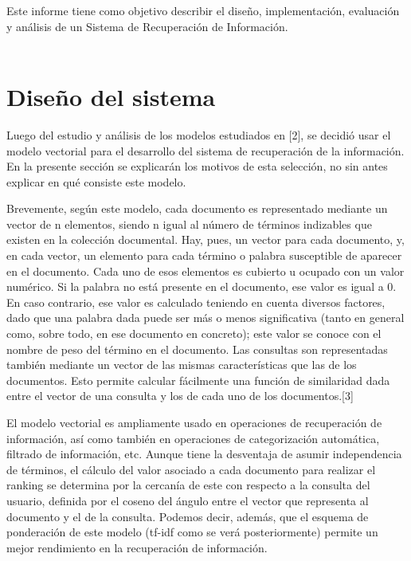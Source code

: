 \documentclass[twoside]{article}
\begin{document}
Este informe tiene como objetivo describir el dise\~no, implementaci\'on, evaluaci\'on y an\'alisis de un Sistema de Recuperaci\'on de Informaci\'on.\\\\


\section{Dise\~no del sistema}
\qquad Luego del estudio y an\'alisis de los modelos estudiados en [2], se decidi\'o usar el modelo vectorial para el desarrollo del sistema de recuperaci\'on de la informaci\'on. En la presente secci\'on se explicar\'an los motivos de esta selecci\'on, no sin antes explicar en qu\'e consiste este modelo.

Brevemente, seg\'un este modelo, cada documento es representado mediante un vector de n elementos, siendo n igual al n\'umero de t\'erminos indizables que existen en la colecci\'on documental. Hay, pues, un vector para cada documento, y, en cada vector, un elemento para cada t\'ermino o palabra susceptible de aparecer en el documento. Cada uno de esos elementos es cubierto u ocupado con un valor num\'erico. Si la palabra no est\'a presente en el documento, ese valor es igual a 0. En caso contrario, ese valor es calculado teniendo en cuenta diversos factores, dado que una palabra dada puede ser m\'as o menos significativa (tanto en general como, sobre todo, en ese documento en concreto); este valor se conoce con el nombre de peso del t\'ermino en el documento. Las consultas son representadas tambi\'en mediante un vector de las mismas caracter\'isticas que las de los documentos. Esto permite calcular f\'acilmente una funci\'on de similaridad dada entre el vector de una consulta y los de cada uno de los documentos.[3]

El modelo vectorial es ampliamente usado en operaciones de recuperaci\'on de informaci\'on, as\'i como tambi\'en en operaciones de categorizaci\'on autom\'atica, filtrado de informaci\'on, etc. Aunque tiene la desventaja de asumir independencia de t\'erminos, el c\'alculo del valor asociado a cada documento para realizar el ranking se determina por la cercan\'ia de este con respecto a la consulta del usuario, definida por el coseno del \'angulo entre el vector que representa al documento y el de la consulta. Podemos decir, adem\'as, que el esquema de ponderaci\'on de este modelo (tf-idf como se ver\'a posteriormente) permite un mejor rendimiento en la recuperaci\'on de informaci\'on.\\\\
\end{document}
